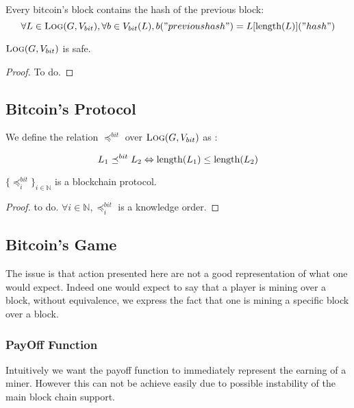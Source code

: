 \begin{mylem*}
	Every bitcoin's block contains the hash of the previous block:
	$$\forall L \in \text{\sc Log}(G,V_{bit}), \forall b \in V_{bit}(L),b("previous hash") = L[\text{\rm length}(L)]("hash") $$
\end{mylem*}

\begin{myprop}
	$\text{\sc Log}(G,V_{bit})$ is safe.
\end{myprop}

\begin{proof}
	To do.
\end{proof}

\subsection{Bitcoin's Protocol}

We define the relation $\preceq^{bit}$ over $\text{\sc Log}(G,V_{bit})$ as : 

$$ L_1 \preceq^{bit} L_2  \Leftrightarrow \text{\rm length}(L_1) \leq \text{\rm length}(L_2)$$

\begin{myprop}
	$\{\preceq^{bit}_i\}_{i\in\mathbb{N}}$ is a blockchain protocol.
\end{myprop}

\begin{proof}
	to do.
	$\forall i\in \mathbb{N}, \preceq^{bit}_i$ is a knowledge order.
\end{proof}

\subsection{Bitcoin's Game}

The issue is that action presented here are not a good representation of what one would expect. Indeed one would expect to say that a player is mining over a block, without equivalence, we express the fact that one is mining a specific block over a block.


\subsubsection{PayOff Function}
Intuitively we want the payoff function to immediately represent the earning of a miner. However this can not be achieve easily due to possible instability of the main block chain support. 

